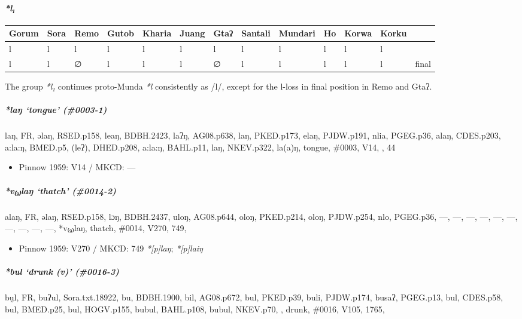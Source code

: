 \documentclass[a4paper,]{article}
\providecommand{\tightlist}{%
  \setlength{\itemsep}{0pt}\setlength{\parskip}{0pt}}
\let\oldparagraph\paragraph
\renewcommand{\paragraph}[1]{\oldparagraph{#1}\mbox{}}
\let\oldsubparagraph\subparagraph
\renewcommand{\subparagraph}[1]{\oldsubparagraph{#1}\mbox{}}
\begin{document}
\paragraph{\texorpdfstring{\emph{*l₁}}{*l₁}}\label{l}

\begin{longtable}[]{@{}lllllllllllll@{}}
\toprule
Gorum & Sora & Remo & Gutob & Kharia & Juang & Gtaʔ & Santali & Mundari
& Ho & Korwa & Korku &\tabularnewline
\midrule
\endhead
l & l & l & l & l & l & l & l & l & l & l & l &\tabularnewline
l & l & ∅ & l & l & l & ∅ & l & l & l & l & l & final\tabularnewline
\bottomrule
\end{longtable}

The group \emph{*l₁} continues proto-Munda \emph{*l} consistently as
/l/, except for the l-loss in final position in Remo and Gtaʔ.

\subparagraph{\texorpdfstring{\emph{*laŋ} `tongue'
(\#0003-1)}{*laŋ tongue (\#0003-1)}}\label{laux14b-tongue-0003-1}

laŋ, FR, əlaŋ, RSED.p158, leaŋ, BDBH.2423, laʔŋ, AG08.p638, laŋ,
PKED.p173, elaŋ, PJDW.p191, nlia, PGEG.p36, alaŋ, CDES.p203, a:la:ŋ,
BMED.p5, (leʔ), DHED.p208, a:la:ŋ, BAHL.p11, laŋ, NKEV.p322, la(a)ŋ,
tongue, \#0003, V14, , 44

\begin{itemize}
\tightlist
\item
  Pinnow 1959: V14 / MKCD: ---
\end{itemize}

\subparagraph{\texorpdfstring{\emph{*v₍₉₎laŋ} `thatch'
(\#0014-2)}{*v₍₉₎laŋ thatch (\#0014-2)}}\label{vlaux14b-thatch-0014-2}

alaŋ, FR, əlaŋ, RSED.p158, lɔŋ, BDBH.2437, uloŋ, AG08.p644, oloŋ,
PKED.p214, oloŋ, PJDW.p254, nlo, PGEG.p36, ---, ---, ---, ---, ---, ---,
---, ---, ---, ---, *v₍₉₎laŋ, thatch, \#0014, V270, 749,

\begin{itemize}
\tightlist
\item
  Pinnow 1959: V270 / MKCD: 749 \emph{*{[}p{]}laŋ}; \emph{*{[}p{]}laiŋ}
\end{itemize}

\subparagraph{\texorpdfstring{\emph{*bul} `drunk (v)'
(\#0016-3)}{*bul drunk (v) (\#0016-3)}}\label{bul-drunk-v-0016-3}

bṵl, FR, buʔul, Sora.txt.18922, bu, BDBH.1900, bil, AG08.p672, bul,
PKED.p39, buli, PJDW.p174, busaʔ, PGEG.p13, bul, CDES.p58, bul,
BMED.p25, bul, HOGV.p155, bubul, BAHL.p108, bubul, NKEV.p70, , drunk,
\#0016, V105, 1765,
\end{document}
